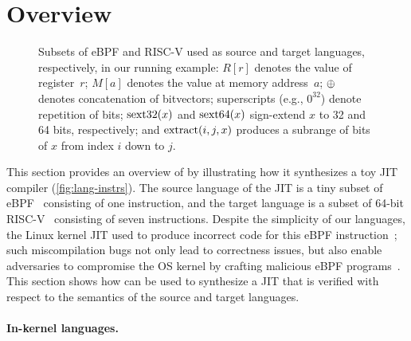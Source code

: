 \section{Overview}
\label{s:overview}

\begin{figure}[h]
  \centering
  \resizebox{\linewidth}{!}{
    
  }
  \vspace{-.5em}
  \caption{Subsets of eBPF and RISC-V
used as source and target languages, respectively,
in our running example:
$R[r]$ denotes the value of register~$r$;
$M[a]$ denotes the value at memory address~$a$;
$\oplus$ denotes concatenation of bitvectors;
superscripts (e.g., $0^{32}$) denote repetition of bits;
$\operatorname{sext32}(x)$ and $\operatorname{sext64}(x)$ sign-extend $x$ to 32 and 64 bits, respectively;
and $\operatorname{extract}(i, j, x)$ produces a subrange of bits of $x$ from index $i$ down to $j$.}
\label{fig:lang-instrs}
\end{figure}

This section provides an overview of \jitsynth by illustrating how it
synthesizes a toy JIT compiler (\autoref{fig:lang-instrs}). The source language
of the JIT is a tiny subset of eBPF~\cite{fleming:ebpf} consisting of one
instruction, and the target language is a subset of 64-bit
RISC-V~\cite{riscv:isa} consisting of seven instructions. Despite the simplicity
of our languages, the Linux kernel JIT used to produce incorrect code for this
eBPF instruction~\cite{nelson:bpf-riscv-add32-bug}; such miscompilation bugs not
only lead to correctness issues, but also enable adversaries to compromise the
OS kernel by crafting malicious eBPF programs~\cite{wang:jitk}. This section
shows how \jitsynth can be used to synthesize a JIT that is verified with
respect to the semantics of the source and target languages.\tighten

\paragraph{In-kernel languages.} 

